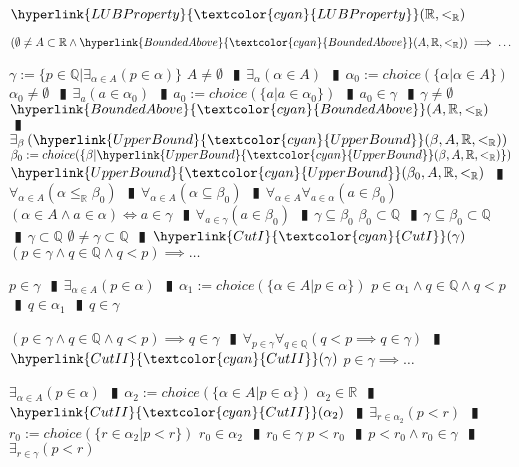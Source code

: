 \documentclass{book}
\newcommand{\wff}[1]{\hypertarget{#1}{\fbox{\textcolor{red}{$#1$}}\phantom{--}}}
\newcommand{\rf}[1]{\hyperlink{#1}{\textcolor{cyan}{#1}}}
\newcommand{\abr}{:=}
\newcommand{\pipe}{$\phantom{(}\vrectangleblack\phantom{)}$}
\newcommand{\pr}[1]{\left(#1\right)}
\begin{document}
\wff{LUBPropertyOfR} $\rf{LUBProperty}(\mathbb{R}, <_{\mathbb{R}})$
\begin{enumerate}
  \lit $\pr{\emptyset \neq A \subset \mathbb{R} \land \rf{BoundedAbove}(A, \mathbb{R}, <_{\mathbb{R}})} \implies \ldots$
  \begin{enumerate}
    \lit $\gamma \abr \{p \in \mathbb{Q} | \exists_{\alpha \in A}(p \in \alpha)\}$
    \lit $A \neq \emptyset$ \pipe $\exists_{\alpha}(\alpha \in A)$ \pipe $\alpha_0 \abr choice(\{\alpha | \alpha \in A\})$
    \lit $\alpha_0 \neq \emptyset$ \pipe $\exists_{a}(a \in \alpha_0)$ \pipe $a_0 \abr choice(\{a | a \in \alpha_0\})$ \pipe $a_0 \in \gamma$ \pipe $\gamma \neq \emptyset$
    \lit $\rf{BoundedAbove}(A, \mathbb{R}, <_{\mathbb{R}})$ \pipe $\exists_{\beta}\pr{\rf{UpperBound}(\beta, A, \mathbb{R}, <_{\mathbb{R}})}$
    \lit $\beta_0 \abr choice(\{\beta | \rf{UpperBound}(\beta, A, \mathbb{R}, <_{\mathbb{R}})\})$
    \lit $\rf{UpperBound}(\beta_0, A, \mathbb{R}, <_{\mathbb{R}})$ \pipe $\forall_{\alpha \in A}(\alpha \leq_{\mathbb{R}} \beta_0)$ \pipe $\forall_{\alpha \in A}(\alpha \subseteq \beta_0)$ \pipe $\forall_{\alpha \in A} \forall_{a \in \alpha}(a \in \beta_0)$
    \lit $(\alpha \in A \land a \in \alpha) \iff a \in \gamma$ \pipe $\forall_{a \in \gamma}(a \in \beta_0)$ \pipe $\gamma \subseteq \beta_0$
    \lit $\beta_0 \subset \mathbb{Q}$ \pipe $\gamma \subseteq \beta_0 \subset \mathbb{Q}$ \pipe $\gamma \subset \mathbb{Q}$
    \lit $\emptyset \neq \gamma \subset \mathbb{Q}$ \pipe $\rf{CutI}(\gamma)$
    \lit $(p \in \gamma \land q \in \mathbb{Q} \land q < p) \implies \ldots$
    \begin{enumerate}
      \lit $p \in \gamma$ \pipe $\exists_{\alpha \in A}(p \in \alpha)$ \pipe $\alpha_1 \abr choice(\{\alpha \in A | p \in \alpha\})$
      \lit $p \in \alpha_1 \land q \in \mathbb{Q} \land q < p$ \pipe $q \in \alpha_1$ \pipe $q \in \gamma$
    \end{enumerate}
    \lit $(p \in \gamma \land q \in \mathbb{Q} \land q < p) \implies q \in \gamma$ \pipe $\forall_{p \in \gamma} \forall_{q \in \mathbb{Q}}(q < p \implies q \in \gamma)$ \pipe $\rf{CutII}(\gamma)$
    \lit $p \in \gamma \implies \ldots$
    \begin{enumerate}
      \lit $\exists_{\alpha \in A}(p \in \alpha)$ \pipe $\alpha_2 \abr choice(\{\alpha \in A | p \in \alpha\})$
      \lit $\alpha_2 \in \mathbb{R}$ \pipe $\rf{CutII}(\alpha_2)$ \pipe $\exists_{r \in \alpha_2}(p < r)$ \pipe $r_0 \abr choice(\{r \in \alpha_2 | p < r\})$
      \lit $r_0 \in \alpha_2$ \pipe $r_0 \in \gamma$
      \lit $p < r_0$ \pipe $p < r_0 \land r_0 \in \gamma$ \pipe $\exists_{r \in \gamma}(p < r)$

\end{enumerate}
\end{enumerate}
\end{enumerate}
\end{document}
